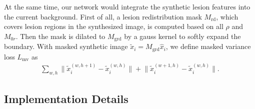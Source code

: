 \documentclass[letterpaper]{article} %
\begin{document}
	At the same time, our network would integrate the synthetic lesion features into the current background. First of all, a lesion redistribution mask $ M_\mathrm{rd} $, which covers lesion regions in the synthesized image, is computed based on all $ \rho $ and $ M_{0r} $. Then the mask is dilated to $ M_\mathrm{grd} $ by a gauss kernel to softly expand the boundary. With masked synthetic image $ \tilde{x}_i = M_\mathrm{grd} \hat{x}_i $, we define masked variance loss $L_\mathrm{mv}$ as
	\begin{align}
	\label{align_mtv_loss} \textstyle
	\sum_{w,h}{\lVert \tilde{x}_i^{(w,h+1)} - \tilde{x}_i^{(w,h)} \lVert}
	+ {\lVert \tilde{x}_i^{(w+1,h)} - \tilde{x}_i^{(w,h)} \lVert}.
	\end{align}







	\subsection{Implementation Details}


\end{document}
